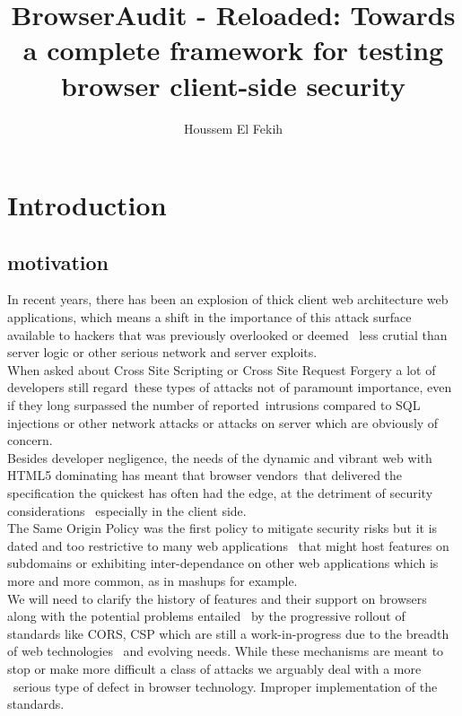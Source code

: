 \documentclass[a4paper,12pt]{report}
\title{BrowserAudit - Reloaded: Towards a complete framework for testing browser client-side security}
\author{Houssem El Fekih}
\begin{document}
\maketitle 
\begin{abstract}
 
\end{abstract}


\tableofcontents
\listoffigures
\listoftables

\pagebreak
{}

\section{Introduction}

\subsection{motivation}
In recent years, there has been an explosion of thick client web architecture web applications,
which means a shift in the importance of this attack surface available to hackers that was previously overlooked or deemed \
less crutial than server logic or other serious network and server exploits.\\

When asked about Cross Site Scripting or Cross Site Request Forgery a lot of developers still regard\
these types of attacks not of paramount importance, even if they long surpassed the number of reported\
intrusions compared to SQL injections or other network attacks or attacks on server which are obviously of concern.\\

Besides developer negligence, the needs of the dynamic and vibrant web with HTML5 dominating has meant that browser vendors\
that delivered the specification the quickest has often had the edge, at the detriment of security considerations \
especially in the client side.\\

The Same Origin Policy was the first policy to mitigate security risks but it is dated and too restrictive to many web applications \
that might host features on subdomains or exhibiting inter-dependance on other web applications which is more and more common, as in mashups \cite{mashup} for example.\\

We will need to clarify the history of features and their support on browsers along with the potential problems entailed \
by the progressive rollout of standards like CORS, CSP which are still a work-in-progress due to the breadth of web technologies \
and evolving needs. While these mechanisms are meant to stop or make more difficult a class of attacks we arguably deal with a more \
serious type of defect in browser technology. Improper implementation of the standards.\\
\end{document}
